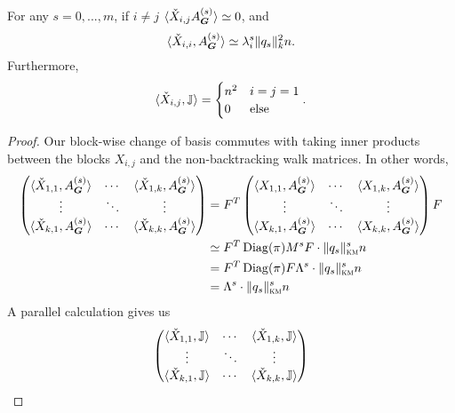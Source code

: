 \begin{lemma}
    For any $s=0,...,m$, if $i\neq j$ $\langle \check X_{i,j} A^{(s)}_{\boldsymbol{G}} \rangle \simeq 0$, and
    $$
        \langle \check X_{i,i}, A^{(s)}_{\boldsymbol{G}} \rangle \simeq \lambda_i^s \|q_s\|^2_{k}n.
    $$
    Furthermore, 
    $$
        \langle \check X_{i,j}, \mathbb{J} \rangle = \begin{cases} n^2 & i=j=1 \\ 0 & \text{else} 
        \end{cases}.
    $$
\end{lemma}

\begin{proof}
    Our block-wise change of basis commutes with taking inner products between the blocks $X_{i,j}$ and the non-backtracking walk matrices. In other words,
    \begin{align*}
        \begin{pmatrix} \langle \check X_{1,1},A^{(s)}_{\boldsymbol{G}}\rangle & \cdots & \langle \check X_{1,k},A^{(s)}_{\boldsymbol{G}}\rangle \\
        \vdots & \ddots & \vdots \\
        \langle \check X_{k,1},A^{(s)}_{\boldsymbol{G}}\rangle & \cdots & \langle \check X_{k,k},A^{(s)}_{\boldsymbol{G}}\rangle 
        \end{pmatrix}
        &= F^T\begin{pmatrix}
        \langle X_{1,1},A^{(s)}_{\boldsymbol{G}}\rangle & \cdots & \langle X_{1,k},A^{(s)}_{\boldsymbol{G}}\rangle \\
        \vdots & \ddots & \vdots \\
        \langle X_{k,1},A^{(s)}_{\boldsymbol{G}}\rangle & \cdots & \langle X_{k,k},A^{(s)}_{\boldsymbol{G}}\rangle 
        \end{pmatrix} F \\
        &\simeq F^T \operatorname{Diag}(\pi)M^s F \cdot \|q_s\|^s_{\textsc{km}} n \\
        &= F^T\operatorname{Diag}(\pi)F\Lambda^s \cdot \|q_s\|^s_{\textsc{km}}n \\
        &= \Lambda^s \cdot \|q_s\|^s_{\textsc{km}}n
    \end{align*}
    A parallel calculation gives us 
    \begin{align*}
        \begin{pmatrix} \langle \check X_{1,1},\bbJ\rangle & \cdots & \langle \check X_{1,k},\bbJ\rangle \\
        \vdots & \ddots & \vdots \\
        \langle \check X_{k,1},\bbJ\rangle & \cdots & \langle \check X_{k,k},\bbJ\rangle 
        \end{pmatrix}

\end{align*}
\end{proof}

